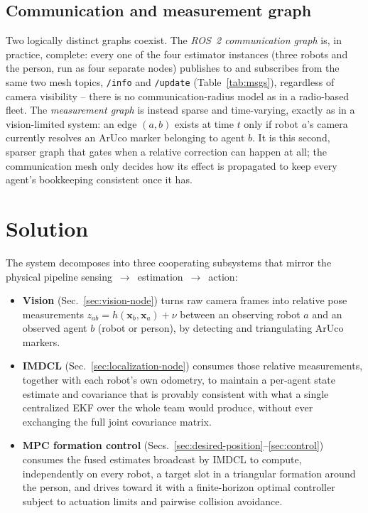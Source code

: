 \documentclass[10pt,conference]{IEEEtran}
\begin{document}
\subsection{Communication and measurement graph}

Two logically distinct graphs coexist. The \emph{ROS~2 communication graph} is, in practice,
complete: every one of the four estimator instances (three robots and the person, run as four
separate nodes) publishes to and subscribes from the same two mesh topics, \texttt{/info} and
\texttt{/update} (Table~\ref{tab:msgs}), regardless of camera visibility -- there is no
communication-radius model as in a radio-based fleet. The \emph{measurement graph} is instead
sparse and time-varying, exactly as in a vision-limited system: an edge $(a,b)$ exists at time
$t$ only if robot $a$'s camera currently resolves an ArUco marker belonging to agent $b$. It is
this second, sparser graph that gates when a relative correction can happen at all; the
communication mesh only decides how its effect is propagated to keep every agent's bookkeeping
consistent once it has.

\section{Solution}

The system decomposes into three cooperating subsystems that mirror the physical pipeline
sensing~$\to$~estimation~$\to$~action:

\begin{itemize}
\item \textbf{Vision} (Sec.~\ref{sec:vision-node}) turns raw camera frames into relative pose
measurements $z_{ab} = h(\mathbf{x}_b,\mathbf{x}_a) + \nu$ between an observing robot $a$ and an
observed agent $b$ (robot or person), by detecting and triangulating ArUco markers.
\item \textbf{IMDCL} (Sec.~\ref{sec:localization-node}) consumes those relative measurements,
together with each robot's own odometry, to maintain a per-agent state estimate and covariance
that is provably consistent with what a single centralized EKF over the whole team would produce,
without ever exchanging the full joint covariance matrix.
\item \textbf{MPC formation control} (Secs.~\ref{sec:desired-position}--\ref{sec:control})
consumes the fused estimates broadcast by IMDCL to compute, independently on every robot, a
target slot in a triangular formation around the person, and drives toward it with a
finite-horizon optimal controller subject to actuation limits and pairwise collision avoidance.
\end{itemize}
\end{document}

